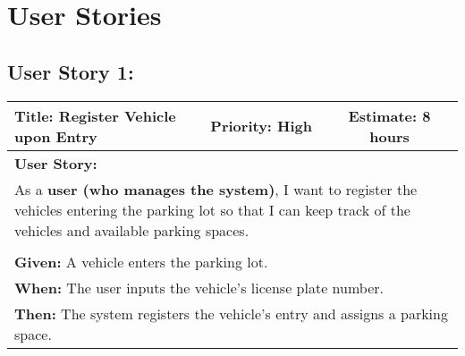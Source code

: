 \section{User Stories}

\subsection{User Story 1:}
\begin{table}[h]
    \centering
    \begin{tabular}{|p{7cm}|p{4cm}|c|}
        \hline
        \rowcolor{lightblue}
        \textbf{Title: Register Vehicle upon Entry} & \textbf{Priority: High} & \textbf{Estimate: 8 hours} \\
        \hline
        \multicolumn{3}{|l|}{\textbf{User Story:}} \\
        \multicolumn{3}{|p{15cm}|}{As a \textbf{user (who manages the system)}, I want to register the vehicles entering the parking lot so that I can keep track of the vehicles and available parking spaces.} \\
        \hline
        \rowcolor{lightblue}
        \multicolumn{3}{|c|}{\textbf{Acceptance Criteria:}} \\
        \hline
        \multicolumn{3}{|l|}{\textbf{Given:} A vehicle enters the parking lot.} \\
        \multicolumn{3}{|l|}{\textbf{When:} The user inputs the vehicle's license plate number.} \\
        \multicolumn{3}{|l|}{\textbf{Then:} The system registers the vehicle's entry and assigns a parking space.} \\
        \hline
    \end{tabular}
\end{table}

